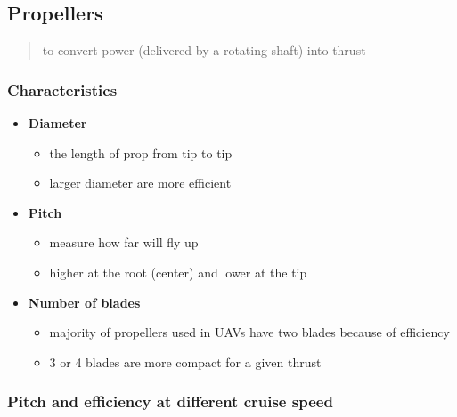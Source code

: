 \documentclass[]{article}
\begin{document}
\subsection{Propellers}\label{header-n2107}

\begin{quote}
to convert power (delivered by a rotating shaft) into thrust
\end{quote}

\subsubsection{Characteristics}\label{header-n2110}

\begin{itemize}
\item
  \textbf{Diameter}

  \begin{itemize}
  \item
    the length of prop from tip to tip
  \item
    larger diameter are more efficient
  \end{itemize}
\item
  \textbf{Pitch}

  \begin{itemize}
  \item
    measure how far will fly up
  \item
    higher at the root (center) and lower at the tip
  \end{itemize}
\item
  \textbf{Number of blades}

  \begin{itemize}
  \item
    majority of propellers used in UAVs have two blades because of
    efficiency
  \item
    3 or 4 blades are more compact for a given thrust
  \end{itemize}
\end{itemize}

\subsubsection{Pitch and efficiency at different cruise
speed}\label{header-n2133}
\end{document}
